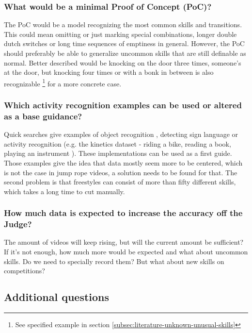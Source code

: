 \subsubsection{What would be a minimal Proof of Concept (PoC)?}
\label{subsubsec:intro-question-poc}

The PoC would be a model recognizing the most common skills and transitions.
This could mean omitting or just marking special combinations, longer double dutch switches or long time sequences of emptiness in general. However, the PoC should preferably be able to generalize uncommon skills that are still definable as normal. Better described would be knocking on the door three times, someone's at the door, but knocking four times or with a bonk in between is also recognizable \footnote{See specified example in section \ref{subsec:literature-unknown-unusual-skills}} for a more concrete case.

\subsubsection{Which activity recognition examples can be used or altered as a base guidance?}
\label{subsubsec:intro-question-earlier-research-guidance}

Quick searches give examples of object recognition \autocite{Diwaker_2022}, detecting sign language \autocite{Bora_2023} or activity recognition (e.g. the kinetics dataset - riding a bike, reading a book, playing an instrument \autocite{Kay_2017}).
These implementations can be used as a first guide.
Those examples give the idea that data mostly seem more to be centered, which is not the case in jump rope videos, a solution needs to be found for that. The second problem is that freestyles can consist of more than fifty different skills, which takes a long time to cut manually.

\subsubsection{How much data is expected to increase the accuracy off the Judge?}
\label{subsubsec:intro-question-expected-data-to-increase-accuracy}

The amount of videos will keep rising, but will the current amount be sufficient? If it's not enough, how much more would be expected and what about uncommon skills. Do we need to specially record them? But what about new skills on competitions?

\subsection{Additional questions}
\label{subsubsec:intro-question-additional}

